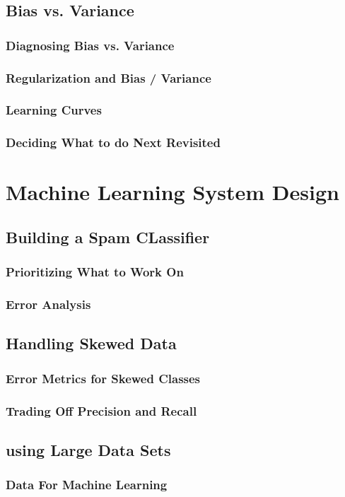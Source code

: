 \documentclass{article}
\begin{document}
\subsection{Bias vs. Variance}
\subsubsection{Diagnosing Bias vs. Variance}
\subsubsection{Regularization and Bias / Variance}
\subsubsection{Learning Curves}
\subsubsection{Deciding What to do Next Revisited}


\section{Machine Learning System Design}
\subsection{Building a Spam CLassifier}
\subsubsection{Prioritizing What to Work On}
\subsubsection{Error Analysis}
\subsection{Handling Skewed Data}
\subsubsection{Error Metrics for Skewed Classes}
\subsubsection{Trading Off Precision and Recall}
\subsection{using Large Data Sets}
\subsubsection{Data For Machine Learning}
\end{document}
